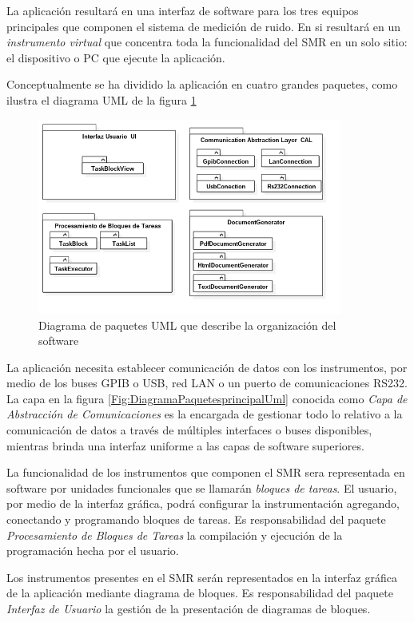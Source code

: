 \documentclass[paper=a4,oneside,fontsize=12pt]{article}
\newcommand{\smr}{sistema de medición de ruido}
\newcommand{\SMR}{SMR\xspace}
\begin{document}
	La aplicación resultará en una interfaz de software para los tres equipos principales que componen el \smr. En si resultará en un \emph{instrumento virtual} que concentra toda la funcionalidad del \SMR en un solo sitio: el dispositivo o PC que ejecute la aplicación.
	
	Conceptualmente se ha dividido la aplicación en cuatro grandes paquetes, como ilustra el diagrama UML de la figura \ref{Fig:DiagramaPaquetesPrincipalUml}
	
	\begin{figure}[H]
		\centering
		\includegraphics[width=10cm]{Imagenes/DiagramaPaquetesPrincipalUml.png}
		\caption{Diagrama de paquetes UML que describe la organización del software}
		\label{Fig:DiagramaPaquetesPrincipalUml}
	\end{figure}

	La aplicación necesita establecer comunicación de datos con los instrumentos, por medio de los buses GPIB o USB, red LAN o un puerto de comunicaciones RS232. La capa en la figura \ref{Fig:DiagramaPaquetesprincipalUml} conocida como \emph{Capa de Abstracción de Comunicaciones} es la encargada de gestionar todo lo relativo a la comunicación de datos a través de múltiples interfaces o buses disponibles, mientras brinda una interfaz uniforme a las capas de software superiores.
	
	La funcionalidad de los instrumentos que componen el \SMR sera representada en software por unidades funcionales que se llamarán  \emph{bloques de tareas}. El usuario, por medio de la interfaz gráfica, podrá configurar la instrumentación agregando, conectando y programando bloques de tareas. Es responsabilidad del paquete \emph{Procesamiento de Bloques de Tareas} la compilación y ejecución de la programación hecha por el usuario.
	
	Los instrumentos presentes en el \SMR serán representados en la interfaz gráfica de la aplicación mediante diagrama de bloques. Es responsabilidad del paquete \emph{Interfaz de Usuario} la gestión de la presentación de diagramas de bloques.
	
\end{document}
